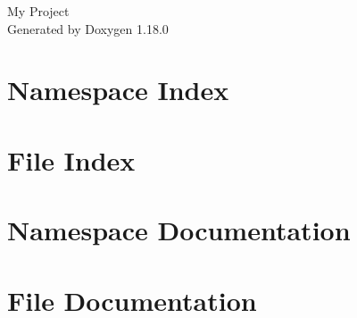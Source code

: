 \documentclass[twoside]{book}
\newcommand{\+}{\discretionary{\mbox{\scriptsize$\hookleftarrow$}}{}{}}
\newcommand{\clearemptydoublepage}{%
    \newpage{\pagestyle{empty}\cleardoublepage}%
  }
\begin{document}
  \raggedbottom
    \hypersetup{pageanchor=false,
                bookmarksnumbered=true,
                pdfencoding=unicode
               }
  \begin{titlepage}
  \vspace*{7cm}
  \begin{center}%
  {\Large My Project}\\
  \vspace*{1cm}
  {\large Generated by Doxygen 1.18.0}\\
  \end{center}
  \end{titlepage}
  \clearemptydoublepage
  \tableofcontents
  \clearemptydoublepage
  \hypersetup{pageanchor=true}
\chapter{Namespace Index}

\chapter{File Index}

\chapter{Namespace Documentation}



\chapter{File Documentation}



  \backmatter
  \newpage
  \clearemptydoublepage
  \printindex
\end{document}
